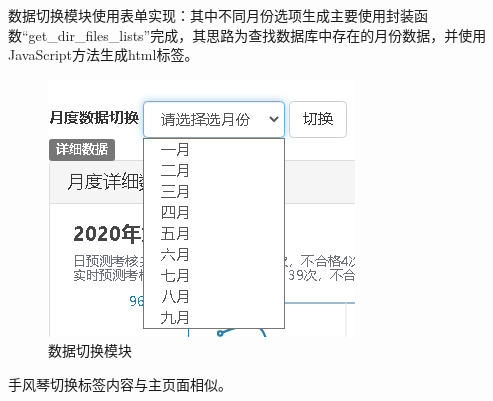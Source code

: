 \documentclass[winfonts,UTF8,a4paper]{ctexart}
\begin{document}
数据切换模块使用表单实现：其中不同月份选项生成主要使用封装函数“get\_dir\_files\_lists”完成，其思路为查找数据库中存在的月份数据，并使用JavaScript方法生成html标签。

\begin{figure}[H]
	\centering
	\includegraphics[width=0.3\linewidth]{pic/screenshot012}
	\caption{数据切换模块}
	\label{fig:screenshot012}
\end{figure}

手风琴切换标签内容与主页面相似。
\end{document}
